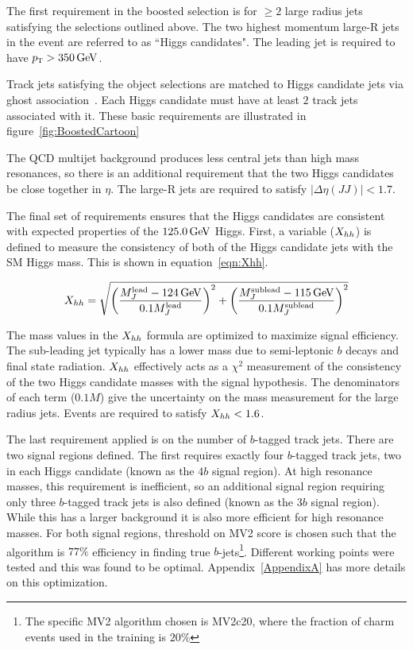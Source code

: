 The first requirement in the boosted selection is for $\geq 2$ large radius jets satisfying the selections outlined above. The two highest momentum large-R jets in the event are referred to as ``Higgs candidates". The leading jet is required to have $\pT > 350 \GeV$. 

Track jets satisfying the object selections are matched to Higgs candidate jets via ghost association~\cite{GhostAssociation}. Each Higgs candidate must have at least $2$ track jets associated with it. These basic requirements are illustrated in figure~\ref{fig:BoostedCartoon}

The QCD multijet background produces less central jets than high mass resonances, so there is an additional requirement that the two Higgs candidates be close together in $\eta$. The large-R jets are required to satisfy $|\Delta\eta(JJ)| < 1.7$. 

The final set of requirements ensures that the Higgs candidates are consistent with expected properties of the $125.0 \GeV$ Higgs. First, a variable ($X_{hh}$) is defined to measure the consistency of both of the Higgs candidate jets with the SM Higgs mass. This is shown in equation~\ref{eqn:Xhh}. 

\begin{equation}
\label{eqn:Xhh}
\Xhh = \sqrt{\left(\frac{M_J^{\rm lead} - 124 \GeV}{0.1 M_J^{\rm lead}}\right)^2 + \left(\frac{M_J^{\rm sublead} - 115 \GeV}{0.1 M_J^{\rm sublead}}\right)^2}
\end{equation}

The mass values in the $X_{hh}$ formula are optimized to maximize signal efficiency. The sub-leading jet typically has a lower mass due to semi-leptonic $b$ decays and final state radiation. $X_{hh}$ effectively acts as a $\chi^2$ measurement of the consistency of the two Higgs candidate masses with the signal hypothesis. The denominators of each term ($0.1M$) give the uncertainty on the mass measurement for the large radius jets. Events are required to satisfy $X_{hh} < 1.6$. 

The last requirement applied is on the number of $b$-tagged track jets. There are two signal regions defined. The first requires exactly four $b$-tagged track jets, two in each Higgs candidate (known as the $4b$ signal region). At high resonance masses, this requirement is inefficient, so an additional signal region requiring only three $b$-tagged track jets is also defined (known as the $3b$ signal region). While this has a larger background it is also more efficient for high resonance masses. For both signal regions, threshold on MV2 score is chosen such that the algorithm is $77\%$ efficiency in finding true $b$-jets\footnote{The specific MV2 algorithm chosen is MV2c20, where the fraction of charm events used in the training is $20\%$}. Different working points were tested and this was found to be optimal. Appendix~\ref{AppendixA} has more details on this optimization. 

